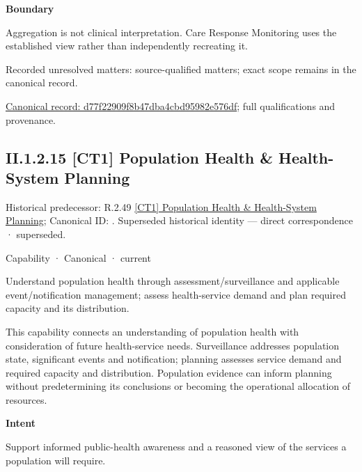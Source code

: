 \textbf{Boundary}



Aggregation is not clinical interpretation. Care Response Monitoring uses the established view rather than independently recreating it.


{\small Recorded unresolved matters: source-qualified matters; exact scope remains in the canonical record.}\par
{\footnotesize \href{../../../../../../../continuum/strategy/capability/d77f22909f8b47dba4cbd95982e576df.md}{Canonical record: d77f22909f8b47dba4cbd95982e576df}; full qualifications and provenance.}\par
\subsection*{II.1.2.15 [CT1] Population Health \& Health-System Planning}
\label{navigation:II.1.2.15}

{\small Historical predecessor: R.2.49 \hyperref[element:a5003436a7f348b1bff60ba593adfa27]{[CT1] Population Health \& Health-System Planning}; Canonical ID: \texttt{}. Superseded historical identity — direct correspondence · superseded.}\par
\label{element:c63b38b37e9b4e9b97dc87ed54604def}
{\small Capability · Canonical · current}\par

Understand population health through assessment/surveillance and applicable event/notification management; assess health-service demand and plan required capacity and its distribution.



This capability connects an understanding of population health with consideration of future health-service needs. Surveillance addresses population state, significant events and notification; planning assesses service demand and required capacity and distribution. Population evidence can inform planning without predetermining its conclusions or becoming the operational allocation of resources.



\textbf{Intent}



Support informed public-health awareness and a reasoned view of the services a population will require.



